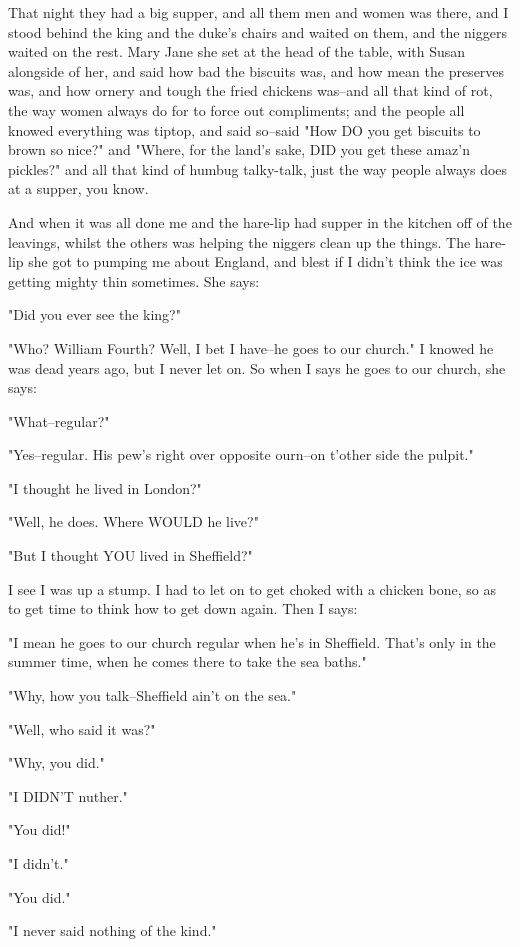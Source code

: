 That night they had a big supper, and all them men and women was there,
and I stood behind the king and the duke's chairs and waited on them, and
the niggers waited on the rest.  Mary Jane she set at the head of the
table, with Susan alongside of her, and said how bad the biscuits was,
and how mean the preserves was, and how ornery and tough the fried
chickens was--and all that kind of rot, the way women always do for to
force out compliments; and the people all knowed everything was tiptop,
and said so--said "How DO you get biscuits to brown so nice?" and "Where,
for the land's sake, DID you get these amaz'n pickles?" and all that kind
of humbug talky-talk, just the way people always does at a supper, you
know.

And when it was all done me and the hare-lip had supper in the kitchen
off of the leavings, whilst the others was helping the niggers clean up
the things.  The hare-lip she got to pumping me about England, and blest
if I didn't think the ice was getting mighty thin sometimes.  She says:

"Did you ever see the king?"

"Who?  William Fourth?  Well, I bet I have--he goes to our church."  I
knowed he was dead years ago, but I never let on.  So when I says he goes
to our church, she says:

"What--regular?"

"Yes--regular.  His pew's right over opposite ourn--on t'other side the
pulpit."

"I thought he lived in London?"

"Well, he does.  Where WOULD he live?"

"But I thought YOU lived in Sheffield?"

I see I was up a stump.  I had to let on to get choked with a chicken
bone, so as to get time to think how to get down again.  Then I says:

"I mean he goes to our church regular when he's in Sheffield.  That's
only in the summer time, when he comes there to take the sea baths."

"Why, how you talk--Sheffield ain't on the sea."

"Well, who said it was?"

"Why, you did."

"I DIDN'T nuther."

"You did!"

"I didn't."

"You did."

"I never said nothing of the kind."

